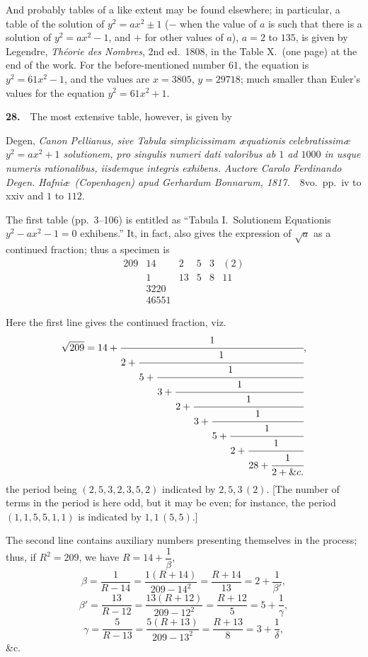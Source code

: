 \documentclass[11pt,a4paper]{article}
\begin{document}
And probably tables of a like extent may be found elsewhere; in particular, a table of the solution of $y^2=ax^2\pm 1$ ($-$ when the value of $a$ is such that there is a solution of $y^2=ax^2-1$, and $+$ for other values of $a$), $a=2$ to $135$, is given by Legendre, \textit{Th\'eorie des Nombres}, 2nd ed.\ 1808, in the Table X.\ (one page) at the end of the work.   For the before-mentioned number $61$, the equation is $y^2=61x^2-1$, and the values are $x=3805$, $y=29718$; much smaller than Euler's values for the equation $y^2=61x^2+1$.

\textbf{28.}\ \ The most extensive table, however, is given by

Degen, \textit{Canon Pellianus, sive Tabula simplicissimam \ae quationis celebratissim\ae\ $y^2=ax^2+1$ solutionem, pro singulis numeri dati valoribus ab $1$ ad $1000$ in usque numeris rationalibus, iisdemque integris exhibens.   Auctore Carolo Ferdinando Degen.   Hafni\ae\ (Copenhagen) apud Gerhardum Bonnarum, 1817.}\ \ 8vo.\ pp.\ iv to xxiv and $1$ to $112$.

The first table (pp.~3--106) is entitled as ``Tabula I.\ Solutionem Equationis $y^2-ax^2-1=0$ exhibens.''   It, in fact, also gives the expression of $\sqrt{a}$ as a continued fraction; thus a specimen is
\[
\begin{array}{c|ccccc}
209 & 14 & 2 & 5 & 3 & (2) \\
    & 1 & 13 & 5 & 8 & 11 \\
    & 3220 & & & & \\
    & 46551 & & & &
\end{array}
\]

Here the first line gives the continued fraction, viz.
\[
\sqrt{209}=14+\cfrac{1}{2+\cfrac{1}{5+\cfrac{1}{3+\cfrac{1}{2+\cfrac{1}{3+\cfrac{1}{5+\cfrac{1}{2+\cfrac{1}{28+\cfrac{1}{2+\&c.}}}}}}}}},
\]
the period being $(2,5,3,2,3,5,2)$ indicated by $2,5,3\,(2)$.   [The number of terms in the period is here odd, but it may be even; for instance, the period $(1,1,5,5,1,1)$ is indicated by $1,1\,(5,5)$.]

The second line contains auxiliary numbers presenting themselves in the process; thus, if $R^2=209$, we have $R=14+\dfrac{1}{\beta}$,
\[
\beta=\dfrac{1}{R-14} = \dfrac{1(R+14)}{209-14^2} = \dfrac{R+14}{13} = 2+\dfrac{1}{\beta'},
\]
\[
\beta'=\dfrac{13}{R-12} = \dfrac{13(R+12)}{209-12^2} = \dfrac{R+12}{5} = 5+\dfrac{1}{\gamma},
\]
\[
\gamma=\dfrac{5}{R-13} = \dfrac{5(R+13)}{209-13^2} = \dfrac{R+13}{8} = 3+\dfrac{1}{\delta},
\]
\&c.
\end{document}
